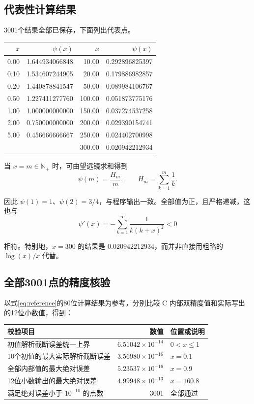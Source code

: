 \documentclass[UTF8,fontset=fandol,zihao=-4,a4paper]{ctexart}
\newcommand{\psif}{\psi}
\begin{document}
\subsection{代表性计算结果}
3001个结果全部已保存，下面列出代表点。
\begin{center}
\begin{tabular}{r@{\qquad}r|r@{\qquad}r}
\toprule
$x$ & $\psif(x)$ & $x$ & $\psif(x)$\\
\midrule
0.00 & 1.644934066848 & 10.00 & 0.292896825397\\
0.10 & 1.534607244905 & 20.00 & 0.179886982857\\
0.20 & 1.440878841547 & 50.00 & 0.089984106767\\
0.50 & 1.227411277760 & 100.00 & 0.051873775176\\
1.00 & 1.000000000000 & 150.00 & 0.037274537258\\
2.00 & 0.750000000000 & 200.00 & 0.029390154741\\
5.00 & 0.456666666667 & 250.00 & 0.024402700998\\
\multicolumn{2}{c|}{} & 300.00 & 0.020942212934\\
\bottomrule
\end{tabular}
\end{center}

当 $x=m\in\mathbb{N}_{+}$ 时，可由望远镜求和得到
\[
 \psif(m)=\frac{H_m}{m},\qquad H_m=\sum_{k=1}^{m}\frac1k.
\]

因此 $\psif(1)=1$、$\psif(2)=3/4$，与程序输出一致。全部值为正，且严格递减，这也与
\[
 \psif'(x)=-\sum_{k=1}^{\infty}\frac1{k(k+x)^2}<0
\]

相符。特别地，$x=300$ 的结果是 $0.020942212934$，而并非直接用粗略的 $\log(x)/x$ 代替。

\subsection{全部3001点的精度核验}
以式\eqref{eq:reference}的80位计算结果为参考，分别比较 C 内部双精度值和实际写出的12位小数值，得到：
\begin{center}
\begin{tabular}{p{7.3cm}r@{\quad}l}
\toprule
校验项目 & 数值 & 位置或说明\\
\midrule
初值解析截断误差统一上界 & $6.51042\times10^{-14}$ & $0<x\le1$\\
10个初值的最大实际解析截断误差 & $3.56980\times10^{-16}$ & $x=0.1$\\
全部内部值的最大绝对误差 & $5.23537\times10^{-16}$ & $x=0.9$\\
12位小数输出的最大绝对误差 & $4.99948\times10^{-13}$ & $x=160.8$\\
满足绝对误差小于 $10^{-10}$ 的点数 & 3001 & 全部通过\\
\bottomrule
\end{tabular}
\end{center}
\end{document}
